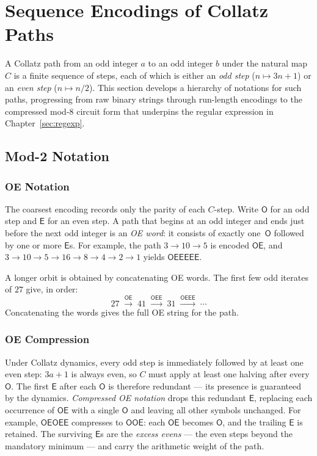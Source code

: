\documentclass[11pt,a4paper]{article}
\theoremstyle{remark}
\theoremstyle{plain}
\begin{document}
\clearpage
\section{Sequence Encodings of Collatz Paths}
\label{sec:seqenc}

A Collatz path from an odd integer $a$ to an odd integer $b$ under the natural
map $C$ is a finite sequence of steps, each of which is either an \emph{odd step}
($n \mapsto 3n+1$) or an \emph{even step} ($n \mapsto n/2$).
This section develops a hierarchy of notations for such paths, progressing from
raw binary strings through run-length encodings to the compressed mod-8 circuit
form that underpins the regular expression in Chapter~\ref{sec:regexp}.

\subsection{Mod-2 Notation}

\subsubsection{OE Notation}

The coarsest encoding records only the parity of each $C$-step.
Write $\mathsf{O}$ for an odd step and $\mathsf{E}$ for an even step.
A path that begins at an odd integer and ends just before the next odd integer is
an \emph{OE word}: it consists of exactly one~$\mathsf{O}$ followed by one or more
$\mathsf{E}$s.
For example, the path $3 \to 10 \to 5$ is encoded $\mathsf{OE}$, and
$3 \to 10 \to 5 \to 16 \to 8 \to 4 \to 2 \to 1$ yields $\mathsf{OEEEEE}$.

A longer orbit is obtained by concatenating OE words.
The first few odd iterates of $27$ give, in order:
\[
  27 \;\xrightarrow{\mathsf{OE}}\; 41 \;\xrightarrow{\mathsf{OEE}}\; 31 \;\xrightarrow{\mathsf{OEEE}}\; \cdots
\]
Concatenating the words gives the full OE string for the path.

\subsubsection{OE Compression}

Under Collatz dynamics, every odd step is immediately followed by at least one even
step: $3a+1$ is always even, so $C$ must apply at least one halving after every
$\mathsf{O}$.
The first $\mathsf{E}$ after each $\mathsf{O}$ is therefore redundant ---
its presence is guaranteed by the dynamics.
\emph{Compressed OE notation} drops this redundant $\mathsf{E}$, replacing each
occurrence of $\mathsf{OE}$ with a single $\mathsf{O}$ and leaving all other symbols
unchanged.
For example, $\mathsf{OEOEE}$ compresses to $\mathsf{OOE}$: each $\mathsf{OE}$
becomes $\mathsf{O}$, and the trailing $\mathsf{E}$ is retained.
The surviving $\mathsf{E}$s are the \emph{excess evens} --- the even steps beyond
the mandatory minimum --- and carry the arithmetic weight of the path.
\end{document}
